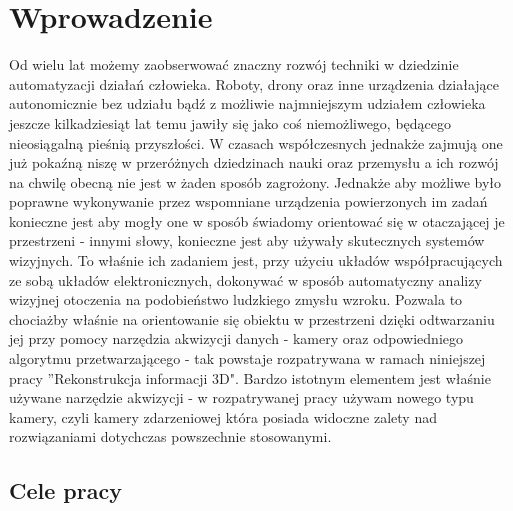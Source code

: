\chapter{Wprowadzenie}
\label{cha:wprowadzenie}

Od wielu lat możemy zaobserwować znaczny rozwój techniki w dziedzinie automatyzacji działań człowieka. Roboty, drony oraz inne urządzenia działające autonomicznie bez udziału bądź z możliwie najmniejszym udziałem człowieka jeszcze kilkadziesiąt lat temu jawiły się jako coś niemożliwego, będącego nieosiągalną pieśnią przyszłości. W czasach współczesnych jednakże zajmują one już pokaźną niszę w przeróżnych dziedzinach nauki oraz przemysłu a ich rozwój na chwilę obecną nie jest w żaden sposób zagrożony. Jednakże aby możliwe było poprawne wykonywanie przez wspomniane urządzenia powierzonych im zadań konieczne jest aby mogły one w sposób świadomy orientować się w otaczającej je przestrzeni - innymi słowy, konieczne jest aby używały skutecznych systemów wizyjnych. To właśnie ich zadaniem jest, przy użyciu układów współpracujących ze sobą układów elektronicznych, dokonywać w sposób automatyczny analizy wizyjnej otoczenia na podobieństwo ludzkiego zmysłu wzroku. Pozwala to chociażby właśnie na orientowanie się obiektu w przestrzeni dzięki odtwarzaniu jej przy pomocy narzędzia akwizycji danych - kamery oraz odpowiedniego algorytmu przetwarzającego - tak powstaje rozpatrywana w ramach niniejszej pracy ''Rekonstrukcja informacji 3D". Bardzo istotnym elementem jest właśnie używane narzędzie akwizycji - w rozpatrywanej pracy używam nowego typu kamery, czyli kamery zdarzeniowej która posiada widoczne zalety nad rozwiązaniami dotychczas powszechnie stosowanymi.



\section{Cele pracy}
\label{sec:celePracy}

